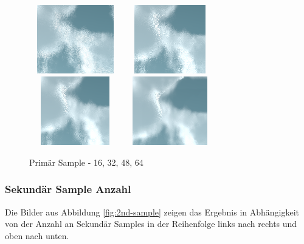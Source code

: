 \begin{figure}[H]
    \centering
    \includegraphics[width=4cm, height=3cm]{figures/1st-sample/1st-sample-16.png}
    \includegraphics[width=4cm, height=3cm]{figures/1st-sample/1st-sample-32.png}
    \includegraphics[width=4cm, height=3cm]{figures/1st-sample/1st-sample-48.png}
    \includegraphics[width=4cm, height=3cm]{figures/1st-sample/1st-sample-64.png}
    \caption{Primär Sample - 16, 32, 48, 64}
    \label{fig:1st-sample}
\end{figure}

\subsubsection{Sekundär Sample Anzahl}
Die Bilder aus Abbildung \ref{fig:2nd-sample} zeigen das Ergebnis in Abhängigkeit von der Anzahl an Sekundär Samples in der Reihenfolge links nach rechts und oben nach unten.

